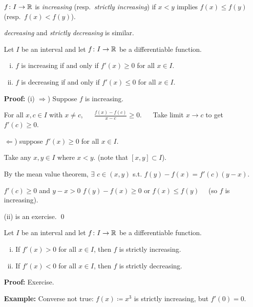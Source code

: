 \documentclass[10pt,aspectratio=169]{beamer}
\begin{document}
\begin{frame}
$f \colon I \to {\mathbb{R}}$ is \emph{increasing}
(resp.\  \emph{strictly increasing}) if
$x < y$ implies
%
$f(x) \leq f(y)$ (resp.\ $f(x) < f(y)$).

\pause
\emph{decreasing} and
\emph{strictly decreasing} is similar.

\pause
\begin{proposition}
Let $I$ be an interval and
let $f \colon I \to {\mathbb{R}}$ be a differentiable function.
\begin{enumerate}[(i)]
\item
\pause
$f$ is increasing if and only if $f'(x) \geq 0$ for all $x \in I$.
\item
\pause
$f$ is decreasing if and only if $f'(x) \leq 0$ for all $x \in I$.
\end{enumerate}
\end{proposition}

\pause
\textbf{Proof:}
(i) $\Rightarrow$) Suppose $f$ is increasing.

\pause
\medskip

For all $x,c \in I$ with $x \neq c$, ~~
$\displaystyle
\frac{f(x)-f(c)}{x-c} \geq 0$.
\pause
~~
Take limit $x \to c$ to get $f'(c) \geq 0$.

\pause
\medskip

$\Leftarrow$) suppose $f'(x) \geq 0$ for all $x \in I$.

\pause
Take any $x, y \in I$ where $x < y$.  (note that $[x,y] \subset I$).

\pause
\medskip

By the mean value theorem, $\exists$ $c \in (x,y)$ s.t.
$\displaystyle
f(y)-f(x) = f'(c)(y-x)$.

\pause
\medskip

$f'(c) \geq 0$ and $y-x > 0$ \wthus $f(y) - f(x) \geq 0$ or $f(x) \leq
f(y)$
\pause
~~(so $f$ is increasing).

\pause
\medskip

(ii) is an exercise.
\qed

\end{frame}

\begin{frame}

\begin{proposition}
Let $I$ be an interval and
let $f \colon I \to {\mathbb{R}}$ be a differentiable function.
\begin{enumerate}[(i)]
\item
\pause
If $f'(x) > 0$ for all $x \in I$, then
$f$ is strictly increasing.
\item
\pause
If $f'(x) < 0$ for all $x \in I$,
then $f$ is strictly decreasing.
\end{enumerate}
\end{proposition}

\pause
\textbf{Proof:} Exercise.

\pause
\medskip

\textbf{Example:} Converse not true: 
$f(x) \coloneqq x^3$ is strictly increasing, but $f'(0) = 0$.

\end{frame}
\end{document}
